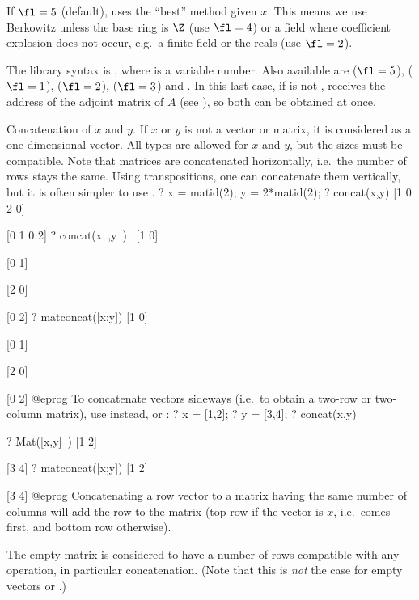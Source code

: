 If $\fl=5$ (default), uses the ``best'' method given $x$.
This means we use Berkowitz unless the base ring is $\Z$ (use $\fl=4$)
or a field where coefficient explosion does not occur,
e.g.~a finite field or the reals (use $\fl=2$).

The library syntax is , where  is a variable number.
Also available are
 ($\fl=5$),
 ($\fl=1$),
 ($\fl=2$),
 ($\fl=3$) and
. In this
last case, if  is not ,  receives the address of
the adjoint matrix of $A$ (see ), so both can be obtained at
once.

\label{se:concat}
Concatenation of $x$ and $y$. If $x$ or $y$ is
not a vector or matrix, it is considered as a one-dimensional vector. All
types are allowed for $x$ and $y$, but the sizes must be compatible. Note
that matrices are concatenated horizontally, i.e.~the number of rows stays
the same. Using transpositions, one can concatenate them vertically,
but it is often simpler to use .
\bprog
? x = matid(2); y = 2*matid(2);
? concat(x,y)
[1 0 2 0]

[0 1 0 2]
? concat(x~,y~)~
[1 0]

[0 1]

[2 0]

[0 2]
? matconcat([x;y])
[1 0]

[0 1]

[2 0]

[0 2]
@eprog\noindent
To concatenate vectors sideways (i.e.~to obtain a two-row or two-column
matrix), use  instead, or :
\bprog
? x = [1,2];
? y = [3,4];
? concat(x,y)

? Mat([x,y]~)
[1 2]

[3 4]
? matconcat([x;y])
[1 2]

[3 4]
@eprog
Concatenating a row vector to a matrix having the same number of columns will
add the row to the matrix (top row if the vector is $x$, i.e.~comes first, and
bottom row otherwise).

The empty matrix \kbd{[;]} is considered to have a number of rows compatible
with any operation, in particular concatenation. (Note that this is
\emph{not} the case for empty vectors \kbd{[~]} or \kbd{[~]\til}.)

